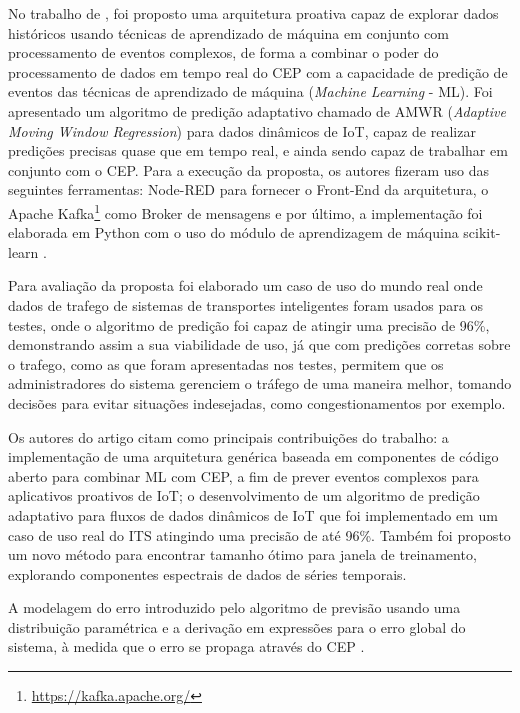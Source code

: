 \documentclass[ti,table]{texufpel} %
\begin{document}
     No trabalho de \cite{art4akbar2017predictive}, foi proposto uma arquitetura proativa capaz de explorar dados históricos usando técnicas de aprendizado de máquina em conjunto com processamento de eventos complexos, de forma a combinar o poder do processamento de dados em tempo real do CEP com a capacidade de predição de eventos das técnicas de aprendizado de máquina (\textit{Machine Learning} - ML). Foi apresentado um algoritmo de predição adaptativo chamado de AMWR (\textit{Adaptive Moving Window Regression}) para dados dinâmicos de IoT, capaz de realizar predições precisas quase que em tempo real, e ainda sendo capaz de trabalhar em conjunto com o CEP. Para a execução da proposta, os autores fizeram uso das seguintes ferramentas: Node-RED para fornecer o Front-End da arquitetura, o Apache Kafka\footnote{\url{https://kafka.apache.org/}} como Broker de mensagens e por último, a implementação foi elaborada em Python com o uso do módulo de aprendizagem de máquina scikit-learn .   

      

     Para avaliação da proposta foi elaborado um caso de uso do mundo real onde dados de trafego de sistemas de transportes inteligentes foram usados para os testes, onde o algoritmo de predição foi capaz de atingir uma precisão de 96\%, demonstrando assim a sua viabilidade de uso, já que com predições corretas sobre o trafego, como as que foram apresentadas nos testes, permitem que os administradores do sistema gerenciem o tráfego de uma maneira melhor, tomando decisões para evitar situações indesejadas, como congestionamentos por exemplo.      

     Os autores do artigo citam como principais contribuições do trabalho: a implementação de uma arquitetura genérica baseada em componentes de código aberto para combinar ML com CEP, a fim de prever eventos complexos para aplicativos proativos de IoT; o desenvolvimento de um algoritmo de predição adaptativo para fluxos de dados dinâmicos de IoT que foi implementado em um caso de uso real do ITS atingindo uma precisão de até 96\%. Também foi proposto um novo método para encontrar tamanho ótimo para janela de treinamento, explorando componentes espectrais de dados de séries temporais. 

     A modelagem do erro introduzido pelo algoritmo de previsão usando uma distribuição paramétrica e a derivação em expressões para o erro global do sistema, à medida que o erro se propaga através do CEP \cite{art4akbar2017predictive}. 

  
\end{document}
